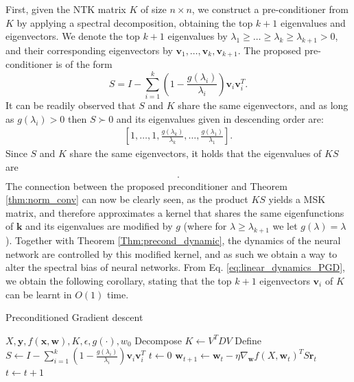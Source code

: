 \documentclass[10pt]{article} %
\theoremstyle{plain}
\theoremstyle{definition}
\theoremstyle{remark}
\newcommand{\norm}[1]{\left\lVert#1\right\rVert}
\newcommand{\vv}{\mathbf{v}}
\newcommand{\x}{\mathbf{x}}
\newcommand{\y}{\mathbf{y}}
\newcommand{\res}{\mathbf{r}}
\newcommand{\w}{\mathbf{w}}
\newcommand{\kr}{\boldsymbol{k}}
\begin{document}
First, given the NTK matrix $K$ of size $n \times n$, we construct a pre-conditioner from $K$ by applying a spectral decomposition, obtaining the top $k+1$ eigenvalues and eigenvectors. We denote the top $k+1$ eigenvalues by $\lambda_1 \geq \ldots \geq \lambda_k \geq \lambda_{k+1} > 0$, and their corresponding eigenvectors by $\vv_1,\ldots,\vv_k,\vv_{k+1}$. The proposed pre-conditioner is of the form 
\begin{equation}\label{eq:preconditioner}
    S = I - \sum_{i=1}^k \left(1-\frac{g(\lambda_{i})}{\lambda_i}\right) \vv_i \vv_i^T.
\end{equation}
It can be readily observed that $S$ and $K$ share the same eigenvectors, and as long as $g(\lambda_i)>0$ then $S\succ 0$ and its eigenvalues given in descending order are: 
\begin{align*}
    \left[1, \ldots, 1,\frac{g(\lambda_{k})}{\lambda_k},\ldots,\frac{g(\lambda_{1})}{\lambda_1} \right].
\end{align*}
Since $S$ and $K$ share the same eigenvectors, it holds that the eigenvalues of $KS$ are 
\begin{align*}[g(\lambda_{1}),\ldots,g(\lambda_{k}),\lambda_{k+1},\lambda_{k+2},..,\lambda_{n}].
\end{align*}
The connection between the proposed preconditioner  and Theorem \ref{thm:norm_conv} can now be clearly seen, as the product $KS$ yields a MSK matrix, and therefore approximates a kernel that shares the same eigenfunctions of  $\kr$ and its eigenvalues are modified by $g$ (where for $\lambda \geq \lambda_{k+1}$ we let $g(\lambda)=\lambda$). Together with Theorem \ref{Thm:precond_dynamic}, the dynamics of the neural network are controlled by this modified kernel, and as such we obtain a way to alter the spectral bias of neural networks. From Eq. \eqref{eq:linear_dynamics_PGD}, we obtain the following corollary, stating that the top $k+1$ eigenvectors $\vv_i$ of $K$ can be learnt in $O(1)$ time.

\begin{algorithm}[tb]
\caption{Preconditioned Gradient descent}\label{alg:algorithm}
\begin{algorithmic}
\REQUIRE $X,\y,f(\x,\w),K,\epsilon,g(\cdot),w_0$
\STATE Decompose $K\gets V^TDV$
\STATE Define $S \gets I - \sum_{i=1}^k \left(1-\frac{g(\lambda_{i})}{\lambda_i}\right) \vv_i \vv_i^T$
\STATE $t\gets 0$
\WHILE{$\norm{\res_t}>\epsilon$}
\STATE $\w_{t+1}\gets \w_{t}-\eta \nabla_\w f(X,\w_t)^TS\res_t$
\STATE $t \gets t+1$
\ENDWHILE
\end{algorithmic}
\end{algorithm}
\end{document}
